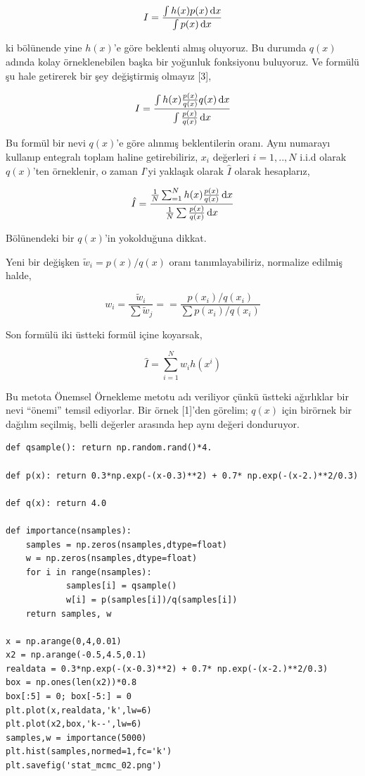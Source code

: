 \documentclass[12pt,fleqn]{article}\usepackage{../../common}
\begin{document}
$$ I = \frac{\int h(x) p(x) \,\mathrm{d} x}{\int p(x) \,\mathrm{d} x} $$

ki bölünende yine $h(x)$'e göre beklenti almış oluyoruz. Bu durumda $q(x)$
adında kolay örneklenebilen başka bir yoğunluk fonksiyonu buluyoruz. Ve formülü
şu hale getirerek bir şey değiştirmiş olmayız [3],

$$ I = \frac
{\int h(x) \frac{p(x)}{q(x)} q(x) \,\mathrm{d} x}
{\int \frac{p(x)}{q(x)} \,\mathrm{d} x}
$$

Bu formül bir nevi $q(x)$'e göre alınmış beklentilerin oranı. Aynı numarayı
kullanıp entegralı toplam haline getirebiliriz, $x_i$ değerleri $i=1,..,N$ i.i.d
olarak $q(x)$'ten örneklenir, o zaman $I$'yi yaklaşık olarak $\hat{I}$ olarak
hesaplarız,

$$ \hat{I} = \frac
{\frac{1}{N}\sum_{=1}^{N} h(x) \frac{p(x)}{q(x)} \,\mathrm{d} x}
{\frac{1}{N}\sum \frac{p(x)}{q(x)} \,\mathrm{d} x}
$$

Bölünendeki bir $q(x)$'in yokolduğuna dikkat.

Yeni bir değişken $\tilde{w}_i = p(x)/q(x)$ oranı tanımlayabiliriz, normalize
edilmiş halde,

$$ w_i = \frac{\tilde{w}_i}{\sum \tilde{w}_j} =
= \frac{p(x_i)/q(x_i)}{\sum p(x_i)/q(x_i)}
$$

Son formülü iki üstteki formül içine koyarsak,

$$ \hat{I} = \sum_{i=1}^{N} w_i h(x^i)$$

Bu metota Önemsel Örnekleme metotu adı veriliyor çünkü üstteki ağırlıklar bir
nevi ``önemi'' temsil ediyorlar.  Bir örnek [1]'den görelim; $q(x)$ için
birörnek bir dağılım seçilmiş, belli değerler arasında hep aynı değeri
donduruyor.

\begin{verbatim}
def qsample(): return np.random.rand()*4.

def p(x): return 0.3*np.exp(-(x-0.3)**2) + 0.7* np.exp(-(x-2.)**2/0.3) 

def q(x): return 4.0

def importance(nsamples):    
    samples = np.zeros(nsamples,dtype=float)
    w = np.zeros(nsamples,dtype=float)    
    for i in range(nsamples):
            samples[i] = qsample()
            w[i] = p(samples[i])/q(samples[i])                
    return samples, w

x = np.arange(0,4,0.01)
x2 = np.arange(-0.5,4.5,0.1)
realdata = 0.3*np.exp(-(x-0.3)**2) + 0.7* np.exp(-(x-2.)**2/0.3) 
box = np.ones(len(x2))*0.8
box[:5] = 0; box[-5:] = 0
plt.plot(x,realdata,'k',lw=6)
plt.plot(x2,box,'k--',lw=6)
samples,w = importance(5000)
plt.hist(samples,normed=1,fc='k')
plt.savefig('stat_mcmc_02.png')
\end{verbatim}
\end{document}

